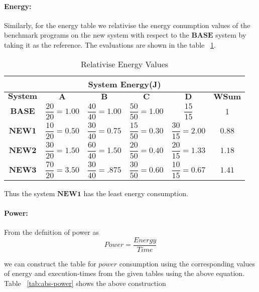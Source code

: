 \documentclass{tufte-handout}
\begin{document}
	  \paragraph{Energy: } Similarly, for the energy table we relativise the energy conumption values of the benchmark programs on the new system with respect to the $\textbf{BASE}$ system by taking it as the reference. The evaluations are shown in the table ~\ref{tab:exec-energy}. 
	
	\begin{table}[!h]
	    \centering
	    \selectfont
		\renewcommand{\arraystretch}{3.0}
		\label{tab:exec-energy}
	    \begin{tabular}{c|c|c|c|c|c}
	      \toprule
		  \multicolumn{6}{|c|}{System Energy(J)}  \\
	      \midrule 
		  $\textbf{System}$ & $\textbf{A}$ & $\textbf{B}$ & $\textbf{C}$ & $\textbf{D}$ & $\textbf{WSum}$ \\  %
		  $\textbf{BASE}$ & $\dfrac{20}{20}=1.00$ & $\dfrac{40}{40} = 1.00$ & $\dfrac{50}{50} = 1.00$ & $\dfrac{15}{15}$ & 1 \\ 
		  $\textbf{NEW1}$ & $\dfrac{10}{20}=0.50$ & $\dfrac{30}{40} = 0.75$ & $\dfrac{15}{50} = 0.30$ & $\dfrac{30}{15} = 2.00$ & $0.88$ \\ 
		  $\textbf{NEW2}$ & $\dfrac{30}{20}=1.50$ & $\dfrac{60}{40} = 1.50$ & $\dfrac{20}{50} = 0.40$ & $\dfrac{20}{15} = 1.33$ & $1.18$ \\ 
		  $\textbf{NEW3}$ & $\dfrac{70}{20}=3.50$ & $\dfrac{30}{40} = .875$ & $\dfrac{30}{50} = 0.60$ & $\dfrac{10}{15} = 0.67$ & $1.41$ \\
	      \bottomrule
	    \end{tabular}
	    \caption{ Relativise Energy Values }
	  \end{table}

	  Thus the system $\textbf{NEW1}$ has the least energy consumption.

	  \paragraph{Power: } From the defnition of power as
	  	\[
			Power = \dfrac{Energy}{Time} 
		\]

		we can construct the table for $power$ consumption using the corresponding values of energy and execution-times from the given tables using the above equation. Table ~\ref{tab:abs-power} shows the above construction
\end{document}
